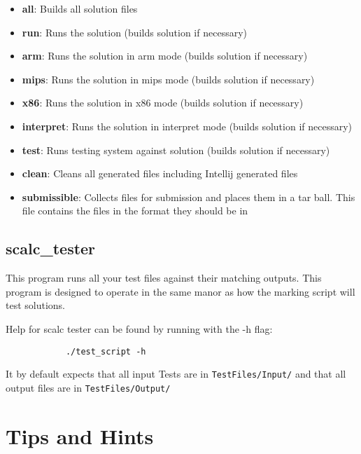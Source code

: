 \documentclass{article}
\begin{document}
		\begin{itemize}
			\item{\textbf{all}}: Builds all solution files
			\item{\textbf{run}}: Runs the solution (builds solution if necessary)
			\item{\textbf{arm}}: Runs the solution in arm mode (builds solution if necessary)
			\item{\textbf{mips}}: Runs the solution in mips mode (builds solution if necessary)
			\item{\textbf{x86}}: Runs the solution in x86 mode (builds solution if necessary)
			\item{\textbf{interpret}}: Runs the solution in interpret mode (builds solution if necessary)
			\item{\textbf{test}}: Runs testing system against solution (builds solution if necessary)
			\item{\textbf{clean}}: Cleans all generated files including Intellij generated files
			\item{\textbf{submissible}}: Collects files for submission and places them in a tar ball. This file contains
			the files in the format they should be in
		\end{itemize}

	\subsection{scalc\_tester}

		This program runs all your test files against their matching outputs. This program is designed to operate in the
		same manor as how the marking script will test solutions.

		Help for scalc tester can be found by running with the -h flag:

		\begin{lstlisting}
			./test_script -h
		\end{lstlisting}

		It by default expects that all input Tests are in \texttt{TestFiles/Input/} and that  all output files are in
		\texttt{TestFiles/Output/}




\section{Tips and Hints}
\end{document}
